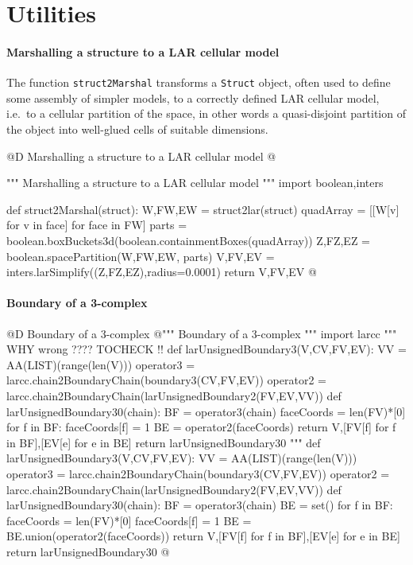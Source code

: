 \documentclass[11pt,oneside]{article}	%
\begin{document}
\appendix
\section{Utilities}


\paragraph{Marshalling a structure to a LAR cellular model}
The function \texttt{struct2Marshal} transforms a \texttt{Struct} object, often used to 
define some assembly of simpler models, to a correctly defined LAR cellular model, i.e.~to
a cellular partition of the space, in other words a quasi-disjoint partition of the object into well-glued cells of suitable dimensions.

@D Marshalling a structure to a LAR cellular model
@{""" Marshalling a structure to a LAR cellular model """
import boolean,inters

def struct2Marshal(struct):
    W,FW,EW = struct2lar(struct)
    quadArray = [[W[v] for v in face] for face in FW]
    parts = boolean.boxBuckets3d(boolean.containmentBoxes(quadArray))
    Z,FZ,EZ = boolean.spacePartition(W,FW,EW, parts)
    V,FV,EV = inters.larSimplify((Z,FZ,EZ),radius=0.0001)
    return V,FV,EV
@}

\paragraph{Boundary of a 3-complex}
@D Boundary of a 3-complex
@{""" Boundary of a 3-complex """
import larcc
"""  WHY wrong ????  TOCHECK !!
def larUnsignedBoundary3(V,CV,FV,EV):
    VV = AA(LIST)(range(len(V)))
    operator3 = larcc.chain2BoundaryChain(boundary3(CV,FV,EV))
    operator2 = larcc.chain2BoundaryChain(larUnsignedBoundary2(FV,EV,VV))
    def larUnsignedBoundary30(chain):
        BF = operator3(chain)
        faceCoords = len(FV)*[0]
        for f in BF: faceCoords[f] = 1
        BE = operator2(faceCoords)
        return V,[FV[f] for f in BF],[EV[e] for e in BE]
    return larUnsignedBoundary30
"""
def larUnsignedBoundary3(V,CV,FV,EV):
    VV = AA(LIST)(range(len(V)))
    operator3 = larcc.chain2BoundaryChain(boundary3(CV,FV,EV))
    operator2 = larcc.chain2BoundaryChain(larUnsignedBoundary2(FV,EV,VV))
    def larUnsignedBoundary30(chain):
        BF = operator3(chain)
        BE = set()
        for f in BF: 
            faceCoords = len(FV)*[0]
            faceCoords[f] = 1
            BE = BE.union(operator2(faceCoords))
        return V,[FV[f] for f in BF],[EV[e] for e in BE]
    return larUnsignedBoundary30
@}
\end{document}
